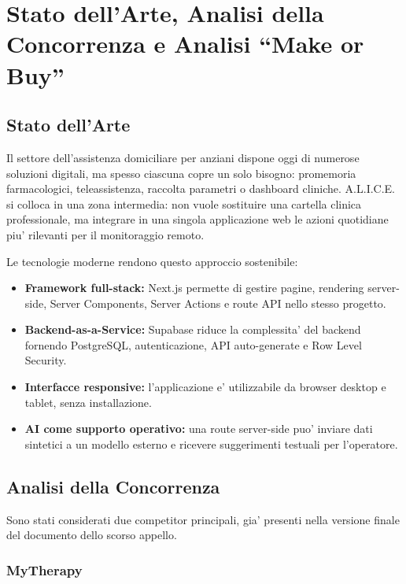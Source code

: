 \section{Stato dell'Arte, Analisi della Concorrenza e Analisi ``Make or Buy''}

\subsection{Stato dell'Arte}

Il settore dell'assistenza domiciliare per anziani dispone oggi di numerose soluzioni digitali, ma spesso ciascuna copre un solo bisogno: promemoria farmacologici, teleassistenza, raccolta parametri o dashboard cliniche. A.L.I.C.E. si colloca in una zona intermedia: non vuole sostituire una cartella clinica professionale, ma integrare in una singola applicazione web le azioni quotidiane piu' rilevanti per il monitoraggio remoto.

Le tecnologie moderne rendono questo approccio sostenibile:

\begin{itemize}
    \item \textbf{Framework full-stack:} Next.js permette di gestire pagine, rendering server-side, Server Components, Server Actions e route API nello stesso progetto.
    \item \textbf{Backend-as-a-Service:} Supabase riduce la complessita' del backend fornendo PostgreSQL, autenticazione, API auto-generate e Row Level Security.
    \item \textbf{Interfacce responsive:} l'applicazione e' utilizzabile da browser desktop e tablet, senza installazione.
    \item \textbf{AI come supporto operativo:} una route server-side puo' inviare dati sintetici a un modello esterno e ricevere suggerimenti testuali per l'operatore.
\end{itemize}

\subsection{Analisi della Concorrenza}

Sono stati considerati due competitor principali, gia' presenti nella versione finale del documento dello scorso appello.

\subsubsection{MyTherapy}

